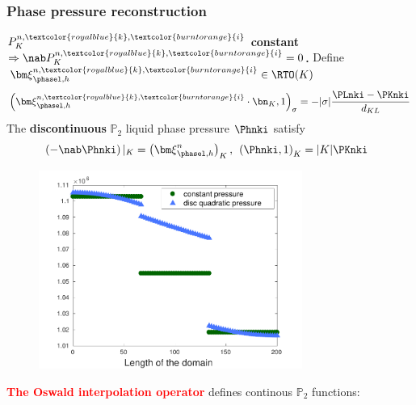 \documentclass[10 pt]{beamer}
\begin{document}
\begin{frame}
\frametitle{Phase pressure reconstruction}
\begin{minipage}{.4 \linewidth}
\textcolor{cadmiumgreen}{\textbf{ $P_K^{n,\textcolor{royalblue}{k}, \textcolor{burntorange}{i}}$ constant $\Rightarrow \nab P_K^{n,\textcolor{royalblue}{k}, \textcolor{burntorange}{i}} =0$.}} 
 Define ${\bm \xi}_{\phasel,h}^{n,\textcolor{royalblue}{k}, \textcolor{burntorange}{i}} \in \RTO(K)$
 \begin{equation*}
 \left({\bm \xi}_{\phasel,h}^{n,\textcolor{royalblue}{k}, \textcolor{burntorange}{i}}\cdot \bn_K,1\right)_{\sigma} = -|\sigma| \frac{\PLnki - \PKnki}{d_{KL}}
\end{equation*}
The \textbf{discontinuous} $\mathbb{P}_2$ liquid phase pressure $\Phnki$ satisfy
\vspace{-0.2 cm}
\begin{equation*}
\hspace{-0.2 cm}
\left(- \nab \Phnki \right)|_{K} = \left({\bm \xi}_{\phasel,h}^n \right)_K, \hspace{0.15 cm} \left(\Phnki,1 \right)_K = |K|\PKnki
\end{equation*}
\end{minipage}
\hfill
\hspace{0.6 cm}\begin{minipage}{.5 \linewidth}
\begin{figure}
 \hspace{0.9 cm} \includegraphics[width=0.77\textwidth]{image/modif_image_post_process_disc}  
\end{figure}
\end{minipage}
\begin{minipage}{.5 \linewidth}
\textcolor{red}{\textbf{The Oswald interpolation operator}}
defines continous $\mathbb{P}_2$ functions:

\end{minipage}
\end{frame}
\end{document}
